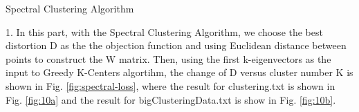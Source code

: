 \begin{description}
\begin{description}
\end{description}

\newpage
\item[(\Romannum{4}).] Spectral Clustering Algorithm

\begin{description}
\item{1.} In this part, with the Spectral Clustering Algorithm, we choose the best distortion D as the the objection function and using Euclidean distance between points to construct the W matrix. Then, using the first k-eigenvectors as the input to Greedy K-Centers algortihm, the change of D versus cluster number K is shown in Fig. \ref{fig:spectral-loss}, where the result for clustering.txt is shown in Fig. \ref{fig:10a} and the result for bigClusteringData.txt is show in Fig. \ref{fig:10b}.


\end{description}
\end{description}
